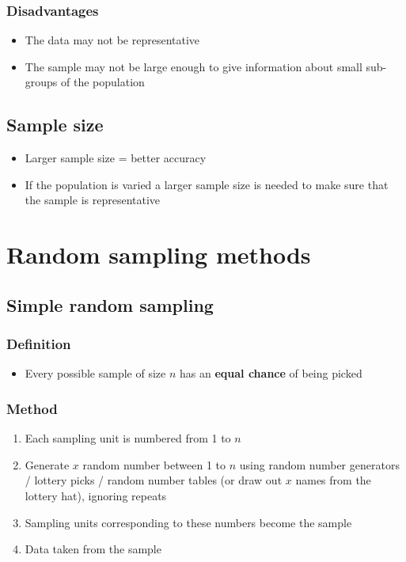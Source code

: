 \subsubsection{Disadvantages}
\begin{itemize}
    \item The data may not be representative
    \item The sample may not be large enough to give information about small sub-groups of the population
\end{itemize}
\subsection{Sample size}
\begin{itemize}
    \item Larger sample size = better accuracy
    \item If the population is varied a larger sample size is needed to make sure that the sample is representative
\end{itemize}


\section{Random sampling methods}
\subsection{Simple random sampling}
\subsubsection{Definition}
\begin{itemize}
    \item Every possible sample of size $n$ has an \textbf{equal chance} of being picked
\end{itemize}
\subsubsection{Method}
\begin{enumerate}
    \item Each sampling unit is numbered from 1 to $n$
    \item Generate $x$ random number between 1 to $n$ using random number generators / lottery picks / random number tables (or draw out $x$ names from the lottery hat), ignoring repeats
    \item Sampling units corresponding to these numbers become the sample
    \item Data taken from the sample
\end{enumerate}
